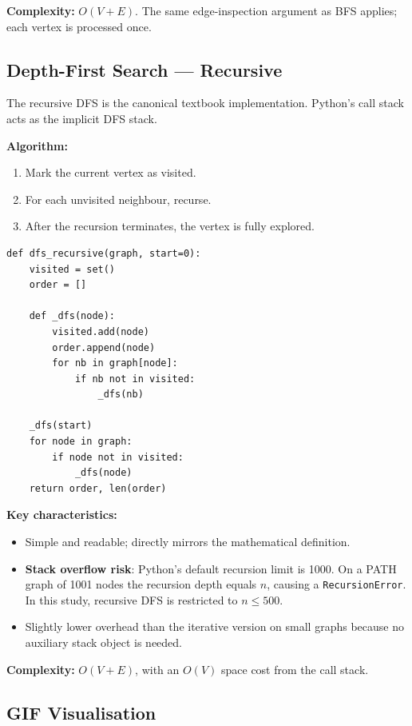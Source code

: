 \textbf{Complexity:} $O(V + E)$. The same edge-inspection argument as BFS applies; each vertex is processed once.


\subsection{Depth-First Search — Recursive}

The recursive DFS is the canonical textbook implementation. Python's call stack acts as the implicit DFS stack.

\textbf{Algorithm:}
\begin{enumerate}
    \item Mark the current vertex as visited.
    \item For each unvisited neighbour, recurse.
    \item After the recursion terminates, the vertex is fully explored.
\end{enumerate}

\begin{verbatim}
def dfs_recursive(graph, start=0):
    visited = set()
    order = []

    def _dfs(node):
        visited.add(node)
        order.append(node)
        for nb in graph[node]:
            if nb not in visited:
                _dfs(nb)

    _dfs(start)
    for node in graph:
        if node not in visited:
            _dfs(node)
    return order, len(order)
\end{verbatim}

\textbf{Key characteristics:}
\begin{itemize}
    \item Simple and readable; directly mirrors the mathematical definition.
    \item \textbf{Stack overflow risk}: Python's default recursion limit is 1000. On a PATH graph of 1001 nodes the recursion depth equals $n$, causing a \texttt{RecursionError}. In this study, recursive DFS is restricted to $n \leq 500$.
    \item Slightly lower overhead than the iterative version on small graphs because no auxiliary stack object is needed.
\end{itemize}

\textbf{Complexity:} $O(V + E)$, with an $O(V)$ space cost from the call stack.


\subsection{GIF Visualisation}

